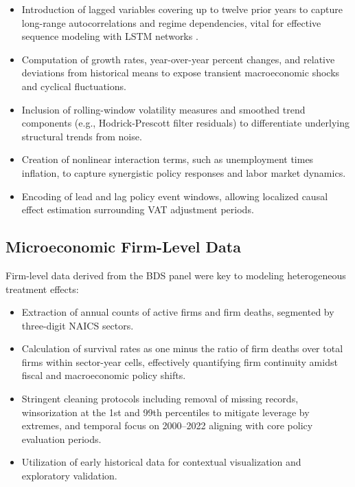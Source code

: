 \begin{itemize}
  \item Introduction of lagged variables covering up to twelve prior years to capture long-range autocorrelations and regime dependencies, vital for effective sequence modeling with LSTM networks \citep{sekhansen2023}.

  \item Computation of growth rates, year-over-year percent changes, and relative deviations from historical means to expose transient macroeconomic shocks and cyclical fluctuations.

  \item Inclusion of rolling-window volatility measures and smoothed trend components (e.g., Hodrick-Prescott filter residuals) to differentiate underlying structural trends from noise.

  \item Creation of nonlinear interaction terms, such as unemployment times inflation, to capture synergistic policy responses and labor market dynamics.

  \item Encoding of lead and lag policy event windows, allowing localized causal effect estimation surrounding VAT adjustment periods.
\end{itemize}

\subsection{Microeconomic Firm-Level Data}\label{subsec:firm_data}

Firm-level data derived from the BDS panel were key to modeling heterogeneous treatment effects:

\begin{itemize}
  \item Extraction of annual counts of active firms and firm deaths, segmented by three-digit NAICS sectors.

  \item Calculation of survival rates as one minus the ratio of firm deaths over total firms within sector-year cells, effectively quantifying firm continuity amidst fiscal and macroeconomic policy shifts.

  \item Stringent cleaning protocols including removal of missing records, winsorization at the 1st and 99th percentiles to mitigate leverage by extremes, and temporal focus on 2000--2022 aligning with core policy evaluation periods.

  \item Utilization of early historical data for contextual visualization and exploratory validation.
\end{itemize}

